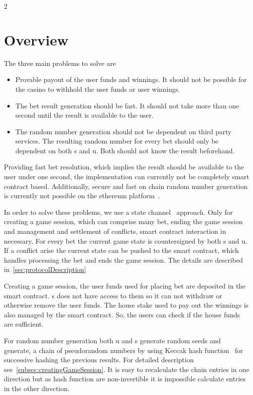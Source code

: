 \documentclass[oneside]{amsart}
\begin{document}
\begin{multicols}{2}
\section{Overview}\label{sec:overview}
The three main problems to solve are
\begin{itemize}
    \item Provable payout of the user funds and winnings. It should not be possible for the casino to withhold the user
        funds or user winnings.
    \item The bet result generation should be fast.
        It should not take more than one second until the result is available to the user.
    \item The random number generation should not be dependent on third party services.
        The resulting random number for every bet should only be dependent on both \gls{s} and \gls{u}.
        Both should not know the result beforehand.
\end{itemize}

Providing fast bet resolution, which implies the result should be available to the user under one second, the implementation
can currently not be completely smart contract based.
Additionally, secure and fast on chain random number generation is currently not possible on the ethereum platform~\cite{hpoc2015}.

In order to solve these problems, we use a state channel~\cite{stateChannel} approach.
Only for creating a game session, which can comprise many bet, ending the game session and management and settlement of
conflicts, smart contract interaction in necessary.
For every bet the current game state is countersigned by both \gls{s} and \gls{u}.
If a conflict arise the current state can be pushed to the smart contract, which handles processing the bet and
ends the game session.
The details are described in~\autoref{sec:protocolDescription}

Creating a game session, the user funds used for placing bet are deposited in the smart contract.
\Gls{s} does not have access to them so it can not withdraw or otherwise remove the user funds.
The house stake used to pay out the winnings is also managed by the smart contract.
So, the users can check if the house funds are sufficient.

For random number generation both \gls{u} and \gls{s} generate random seeds and generate,
a chain of pseudorandom numbers by using Keccak hash function~\cite{keccak} for successive hashing the previous results.
For detailed description see~\autoref{subsec:creatingGameSession}.
It is easy to recalculate the chain entries in one direction but as hash function are non-invertible it is impossible
calculate entries in the other direction.


\end{multicols}
\end{document}
